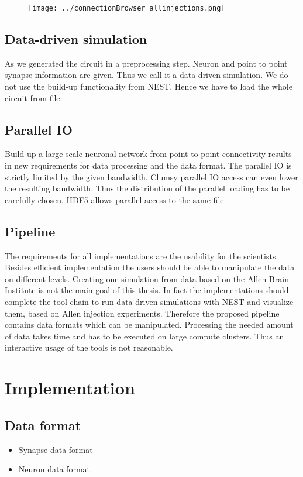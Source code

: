 \documentclass[a4paper]{article}
\begin{document}
\begin{figure}[ht!]
\centering
\texttt{[image: ../connectionBrowser\_allinjections.png]}
\end{figure}



\subsection{Data-driven simulation}
As we generated the circuit in a preprocessing step. Neuron and point to point synapse information are given.
Thus we call it a data-driven simulation. We do not use the build-up functionality from NEST.
Hence we have to load the whole circuit from file.

\subsection{Parallel IO}
Build-up a large scale neuronal network from point to point connectivity results in new requirements for data processing and the data format. The parallel IO is strictly limited by the given bandwidth. Clumsy parallel IO access can even lower the resulting bandwidth.
Thus the distribution of the parallel loading has to be carefully chosen. HDF5 allows parallel access to the same file.

\subsection{Pipeline}
The requirements for all implementations are the usability for the scientists. Besides efficient implementation the users should be able to manipulate the data on different levels. Creating one simulation from data based on the Allen Brain Institute is not the main goal of this thesis. In fact the implementations should complete the tool chain to run data-driven simulations with NEST and visualize them, based on Allen injection experiments. Therefore the proposed pipeline contains data formats which can be manipulated. Processing the needed amount of data takes time and has to be executed on large compute clusters. Thus an interactive usage of the tools is not reasonable.

\section{Implementation}

\subsection{Data format}
\begin{itemize}
      \item Synapse data format
      \item Neuron data format
\end{itemize}
\end{document}
